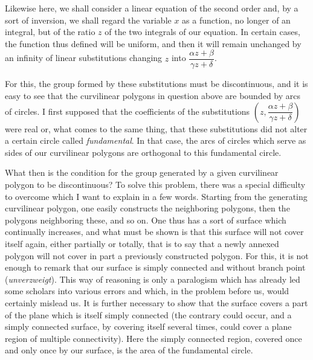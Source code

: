 \documentclass[11pt]{article}
\begin{document}
Likewise here, we shall consider a linear equation of the second order and, by a sort of inversion, we shall regard the variable $x$ as a function, no longer of an integral, but of the ratio $z$ of the two integrals of our equation. In certain cases, the function thus defined will be uniform, and then it will remain unchanged by an infinity of linear substitutions changing $z$ into $\dfrac{\alpha z+\beta}{\gamma z+\delta}$.

For this, the group formed by these substitutions must be discontinuous, and it is easy to see that the curvilinear polygons in question above are bounded by arcs of circles. I first supposed that the coefficients of the substitutions $\left(z,\dfrac{\alpha z+\beta}{\gamma z+\delta}\right)$ were real or, what comes to the same thing, that these substitutions did not alter a certain circle called \emph{fundamental}. In that case, the arcs of circles which serve as sides of our curvilinear polygons are orthogonal to this fundamental circle.

What then is the condition for the group generated by a given curvilinear polygon to be discontinuous? To solve this problem, there was a special difficulty to overcome which I want to explain in a few words. Starting from the generating curvilinear polygon, one easily constructs the neighboring polygons, then the polygons neighboring these, and so on. One thus has a sort of surface which continually increases, and what must be shown is that this surface will not cover itself again, either partially or totally, that is to say that a newly annexed polygon will not cover in part a previously constructed polygon. For this, it is not enough to remark that our surface is simply connected and without branch point (\emph{unverzweigt}). This way of reasoning is only a paralogism which has already led some scholars into various errors and which, in the problem before us, would certainly mislead us. It is further necessary to show that the surface covers a part of the plane which is itself simply connected (the contrary could occur, and a simply connected surface, by covering itself several times, could cover a plane region of multiple connectivity). Here the simply connected region, covered once and only once by our surface, is the area of the fundamental circle.
\end{document}

